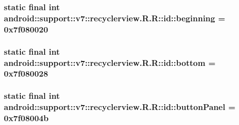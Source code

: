 \hypertarget{classandroid_1_1support_1_1v7_1_1recyclerview_1_1_r_1_1id_c866ffae10ad02345d2534c0a85350c0}{
\subsubsection[{beginning}]{\setlength{\rightskip}{0pt plus 5cm}static final int android::support::v7::recyclerview.R.R::id::beginning = 0x7f080020}}
\label{classandroid_1_1support_1_1v7_1_1recyclerview_1_1_r_1_1id_c866ffae10ad02345d2534c0a85350c0}


\hypertarget{classandroid_1_1support_1_1v7_1_1recyclerview_1_1_r_1_1id_25e000632c77fa3480c3317a59ab7759}{
\subsubsection[{bottom}]{\setlength{\rightskip}{0pt plus 5cm}static final int android::support::v7::recyclerview.R.R::id::bottom = 0x7f080028}}
\label{classandroid_1_1support_1_1v7_1_1recyclerview_1_1_r_1_1id_25e000632c77fa3480c3317a59ab7759}


\hypertarget{classandroid_1_1support_1_1v7_1_1recyclerview_1_1_r_1_1id_22a1ba359af90600c87a4835b968eec0}{
\subsubsection[{buttonPanel}]{\setlength{\rightskip}{0pt plus 5cm}static final int android::support::v7::recyclerview.R.R::id::buttonPanel = 0x7f08004b}}
\label{classandroid_1_1support_1_1v7_1_1recyclerview_1_1_r_1_1id_22a1ba359af90600c87a4835b968eec0}


